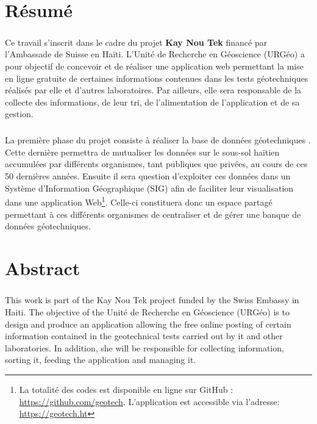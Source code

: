 \chapter*{Résumé}
\paragraph{}
Ce travail s'inscrit dans le cadre du projet \textbf{Kay Nou Tek}
financé par l’Ambassade de Suisse en Haïti. 
L'Unité de Recherche en Géoscience (URGéo) a pour objectif de concevoir et de réaliser
une application web permettant la mise en 
ligne gratuite de certaines informations contenues dans les tests 
géotechniques réalisés par elle et d’autres laboratoires.
Par ailleurs, elle sera responsable de la collecte des informations, de leur tri, de l’alimentation 
de l’application et de sa gestion. 
\paragraph{}
La première phase du projet consiste à réaliser la base de données géotechniques
. Cette dernière permettra de mutualiser les données 
 sur le sous-sol haïtien accumulées par différents organismes, tant publiques que privées, 
 au cours de ces 50 dernières années. Ensuite il sera question d'exploiter ces 
 données dans un Système d'Information Géographique (SIG)  afin de faciliter leur visualisation 
 dans une application
 Web\footnote{ 
    La totalité des codes est disponible en ligne sur GitHub : 
    \url{https://github.com/geotech}.
    L’application est accessible via l’adresse: 
    \url{https://geotech.ht}
 }. Celle-ci
 constituera donc un espace 
 partagé permettant à ces différents organismes de centraliser et de gérer une banque 
 de données géotechniques.


\newpage
\chapter*{Abstract}
\paragraph{}
This work is part of the Kay Nou Tek project funded by the Swiss 
Embassy in Haiti. The objective of the Unité de Recherche en Géoscience (URGéo) 
is to design and produce an application allowing the free online posting 
of certain information contained in the geotechnical tests carried out by 
it and other laboratories. In addition, she will be responsible for collecting 
information, sorting it, feeding the application and managing it.
